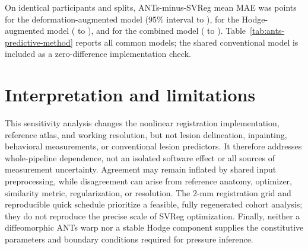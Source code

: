 \documentclass[11pt]{article}
\begin{document}
\begin{table}[ht]
\centering
\caption{Complete repeated nested-CV results using ANTs-derived features.}
\label{tab:ants-models}
\scriptsize
\resizebox{\textwidth}{!}{}
\end{table}

\begin{table}[ht]
\centering
\caption{Complete paired MAE comparisons using ANTs-derived features.}
\label{tab:ants-paired}
\scriptsize
\resizebox{\textwidth}{!}{}
\end{table}

On identical participants and splits, ANTs-minus-SVReg mean MAE was
\AntsVsSvregDeformationDifference{} points for the deformation-augmented model
(95\% interval \AntsVsSvregDeformationCILow{} to
\AntsVsSvregDeformationCIHigh{}), \AntsVsSvregHodgeDifference{} for the
Hodge-augmented model (\AntsVsSvregHodgeCILow{} to
\AntsVsSvregHodgeCIHigh{}), and \AntsVsSvregCombinedDifference{} for the
combined model (\AntsVsSvregCombinedCILow{} to
\AntsVsSvregCombinedCIHigh{}). Table~\ref{tab:ants-predictive-method}
reports all common models; the shared conventional model is included as a
zero-difference implementation check.

\begin{table}[ht]
\centering
\caption{Direct ANTs--SVReg prediction comparison on shared outer-CV splits.
Positive $\Delta$MAE indicates larger error with ANTs.}
\label{tab:ants-predictive-method}
\scriptsize
\resizebox{\textwidth}{!}{}
\end{table}

\section{Interpretation and limitations}

This sensitivity analysis changes the nonlinear registration implementation,
reference atlas, and working resolution, but not lesion delineation,
inpainting, behavioral measurements, or conventional lesion predictors. It
therefore addresses whole-pipeline dependence, not an isolated software effect
or all sources of measurement uncertainty. Agreement may remain inflated by
shared input preprocessing, while disagreement can arise from reference
anatomy, optimizer, similarity metric, regularization, or resolution. The
2-mm registration grid and reproducible quick schedule prioritize a feasible,
fully regenerated cohort analysis; they do not reproduce the precise scale of
SVReg optimization. Finally, neither a diffeomorphic ANTs warp nor a stable
Hodge component supplies the constitutive parameters and boundary conditions
required for pressure inference.
\end{document}

